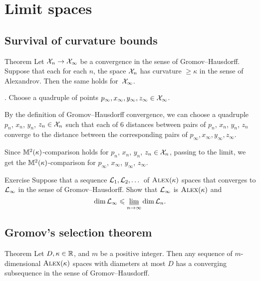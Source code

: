 
\chapter{Limit spaces}\label{chap:lim}


\section{Survival of curvature bounds}

\begin{thm}{Theorem}\label{thm:CBB-closed}
Let $\spc{X}_n\z\to \spc{X}_\infty$ be a convergence in the sense of Gromov--Hausdorff.
Suppose that each for each $n$, the space $\mathcal{X}_n$ has curvature $\ge\kappa$ in the sense of Alexandrov.
Then the same holds for~$\mathcal{X}_\infty$.
\end{thm}

.
Choose a quadruple of points $p_\infty, x_\infty,y_\infty,z_\infty\in \mathcal{X}_\infty$.

By the definition of Gromov--Hausdorff convergence, we can choose a quadruple $p_n$,  $x_n$, $y_n$, $z_n\in \mathcal{X}_n$ such that each of 6 distances between pairs of $p_n$, $x_n$, $y_n$, $z_n$ converge to the distance between the corresponding pairs of $p_\infty, x_\infty,y_\infty,z_\infty$.

Since $\mathbb{M}^2(\kappa)$-comparison holds for $p_n$, $x_n$, $y_n$, $z_n\z\in \spc{X}_n$,
passing to the limit, we get the $\mathbb{M}^2(\kappa)$-comparison for $p_\infty$,  $x_\infty$, $y_\infty$, $z_\infty$.
\qeds

\begin{thm}{Exercise}\label{ex:dim-lim}
Suppose that a sequence $\mathcal{L}_1,\mathcal{L}_2,\dots$ of $\textsc{Alex}(\kappa)$ spaces that converges to $\mathcal{L}_\infty$ in the sense of Gromov--Hausdorff.
Show that $\mathcal{L}_\infty$ is $\textsc{Alex}(\kappa)$ and
\[\operatorname{\rm dim}\nolimits \mathcal{L}_\infty\leqslant \varliminf_{n\to\infty} \operatorname{\rm dim}\nolimits \mathcal{L}_n.\]
\end{thm}

\section{Gromov's selection theorem}

\begin{thm}{Theorem}\label{thm:gromov-compactness}
Let $D,\kappa\in\mathbb{R}$, and $m$ be a positive integer. 
Then any sequence of $m$-dimensional $\textsc{Alex}(\kappa)$ spaces with diameters at most $D$
has a converging subsequence in the sense of Gromov--Hausdorff.
\end{thm}


